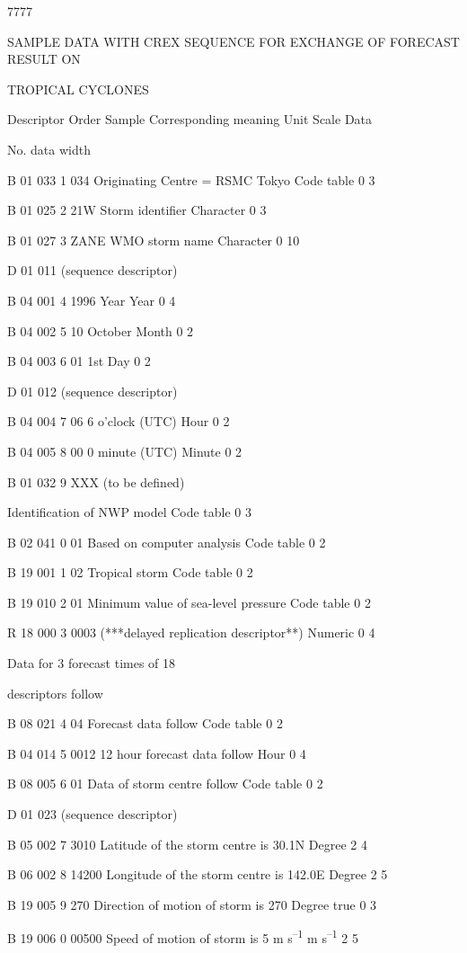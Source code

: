7777

SAMPLE DATA WITH CREX SEQUENCE FOR EXCHANGE OF FORECAST RESULT ON

TROPICAL CYCLONES

Descriptor Order Sample Corresponding meaning Unit Scale Data

No. data width

B 01 033 1 034 Originating Centre = RSMC Tokyo Code table 0 3

B 01 025 2 21W Storm identifier Character 0 3

B 01 027 3 ZANE WMO storm name Character 0 10

D 01 011 (sequence descriptor)

B 04 001 4 1996 Year Year 0 4

B 04 002 5 10 October Month 0 2

B 04 003 6 01 1st Day 0 2

D 01 012 (sequence descriptor)

B 04 004 7 06 6 o'clock (UTC) Hour 0 2

B 04 005 8 00 0 minute (UTC) Minute 0 2

B 01 032 9 XXX (to be defined)

Identification of NWP model Code table 0 3

B 02 041 0 01 Based on computer analysis Code table 0 2

B 19 001 1 02 Tropical storm Code table 0 2

B 19 010 2 01 Minimum value of sea-level pressure Code table 0 2

R 18 000 3 0003 (***delayed replication descriptor**) Numeric 0 4

Data for 3 forecast times of 18

descriptors follow

B 08 021 4 04 Forecast data follow Code table 0 2

B 04 014 5 0012 12 hour forecast data follow Hour 0 4

B 08 005 6 01 Data of storm centre follow Code table 0 2

D 01 023 (sequence descriptor)

B 05 002 7 3010 Latitude of the storm centre is 30.1N Degree 2 4

B 06 002 8 14200 Longitude of the storm centre is 142.0E Degree 2 5

B 19 005 9 270 Direction of motion of storm is 270 Degree true 0 3

B 19 006 0 00500 Speed of motion of storm is 5 m s\textsuperscript{--1} m s\textsuperscript{--1} 2 5

